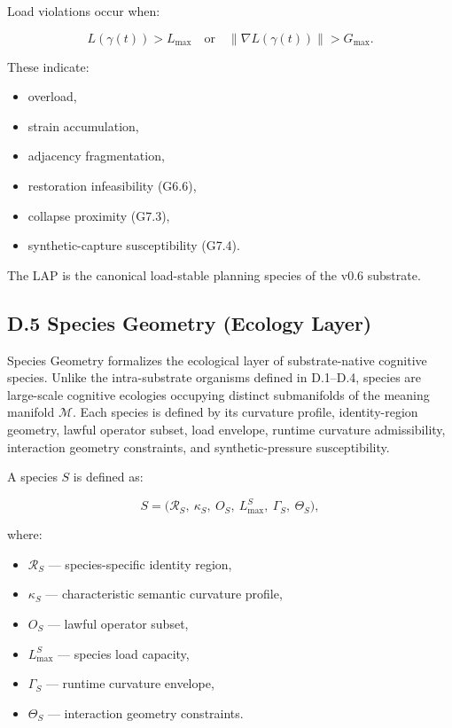 \medskip

\noindent Load violations occur when:


\[
L(\gamma(t)) > L_{\max}
\quad \text{or} \quad
\|\nabla L(\gamma(t))\| > G_{\max}.
\]



These indicate:
\begin{itemize}
    \item overload,
    \item strain accumulation,
    \item adjacency fragmentation,
    \item restoration infeasibility (G6.6),
    \item collapse proximity (G7.3),
    \item synthetic-capture susceptibility (G7.4).
\end{itemize}

\medskip

\noindent The LAP is the canonical load-stable planning species of the v0.6
substrate.



\subsection*{D.5 Species Geometry (Ecology Layer)}

\noindent Species Geometry formalizes the ecological layer of substrate-native
cognitive species. Unlike the intra-substrate organisms defined in D.1–D.4,
species are large-scale cognitive ecologies occupying distinct submanifolds of
the meaning manifold $\mathcal{M}$. Each species is defined by its curvature
profile, identity-region geometry, lawful operator subset, load envelope,
runtime curvature admissibility, interaction geometry constraints, and
synthetic-pressure susceptibility.

\medskip

\noindent A species $S$ is defined as:


\[
S = \big(\mathcal{R}_S,\ \kappa_S,\ O_S,\ L_{\max}^S,\ \Gamma_S,\ \Theta_S\big),
\]


where:
\begin{itemize}
    \item $\mathcal{R}_S$ — species-specific identity region,
    \item $\kappa_S$ — characteristic semantic curvature profile,
    \item $O_S$ — lawful operator subset,
    \item $L_{\max}^S$ — species load capacity,
    \item $\Gamma_S$ — runtime curvature envelope,
    \item $\Theta_S$ — interaction geometry constraints.
\end{itemize}

